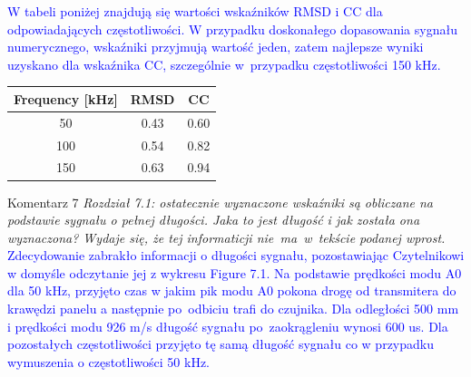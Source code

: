 \documentclass[10pt,aspectratio=169]{beamer} %
\begin{document}
\begin{frame}
\textcolor{blue}{W tabeli poniżej znajdują się wartości wskaźników RMSD i CC dla odpowiadających częstotliwości. W przypadku doskonałego dopasowania sygnału numerycznego, wskaźniki przyjmują wartość jeden, zatem najlepsze wyniki uzyskano dla wskaźnika CC, szczególnie w~przypadku częstotliwości 150 kHz.}
	\begin{table}[H]
		\small
		\tabcolsep=0.5cm
		\centering
		\begin{tabular}{ccc}
			\toprule
			\textbf{Frequency} [kHz] & RMSD & CC\\
			\midrule
			50 & 0.43 & 0.60\\
			100 & 0.54 & 0.82\\
			150 & 0.63 & 0.94\\
			\bottomrule
		\end{tabular}
	\end{table}

\end{frame}
\begin{frame}[label=frame12]{Komentarz 7}\justifying
\textit{Rozdział 7.1: ostatecznie wyznaczone wskaźniki są obliczane na podstawie sygnału o pełnej długości. Jaka to jest długość i jak została ona wyznaczona? Wydaje się, że tej informaticji nie~ma~w~tekście podanej wprost.}\\
\textcolor{blue}{Zdecydowanie zabrakło informacji o długości sygnału, pozostawiając Czytelnikowi w domyśle odczytanie jej z wykresu Figure 7.1. Na podstawie prędkości modu A0 dla 50 kHz, przyjęto czas w jakim pik modu A0 pokona drogę od transmitera do krawędzi panelu a następnie po~odbiciu trafi do czujnika. Dla odległości 500 mm i prędkości modu 926 m/s długość sygnału po~zaokrągleniu wynosi 600 us. Dla pozostałych częstotliwości przyjęto tę samą długość sygnału co w przypadku wymuszenia o częstotliwości 50 kHz.}
\end{frame}
\end{document}
